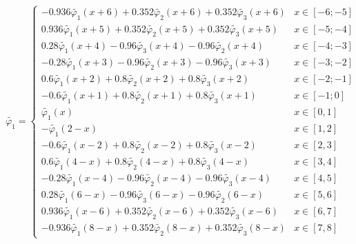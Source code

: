 \documentclass[a4paper, 12pt,fleqn]{extarticle}
\begin{document}
\[
    \tilde{\varphi_1}=
    \begin{cases}
        -0.936 \tilde{\varphi_1}(x+6) + 0.352 \tilde{\varphi_2}(x+6) + 0.352 \tilde{\varphi_3}(x+6)&x\in[-6;-5]\\
        0.936 \tilde{\varphi_1}(x+5) + 0.352 \tilde{\varphi_2}(x+5) + 0.352 \tilde{\varphi_3}(x+5)&x\in[-5;-4]\\
        0.28 \tilde{\varphi_1}(x+4) - 0.96 \tilde{\varphi_3}(x+4) - 0.96 \tilde{\varphi_2}(x+4)&x\in[-4;-3] \\
        -0.28 \tilde{\varphi_1}(x+3) - 0.96 \tilde{\varphi_2}(x+3) - 0.96 \tilde{\varphi_3}(x+3)&x\in[-3;-2] \\
        0.6 \tilde{\varphi_1}(x+2)  + 0.8 \tilde{\varphi_2}(x+2)+ 0.8 \tilde{\varphi_3}(x+2)&x\in[-2;-1]\\
        -0.6 \tilde{\varphi_1}(x+1) + 0.8 \tilde{\varphi_2}(x+1) + 0.8 \tilde{\varphi_3}(x+1)&x\in[-1;0]\\
        \tilde{\varphi_1}(x)&x\in[0,1]\\
        -\tilde{\varphi_1}(2-x)&x\in[1,2]\\
        -0.6 \tilde{\varphi_1}(x-2) + 0.8 \tilde{\varphi_2}(x-2) + 0.8 \tilde{\varphi_3}(x-2)&x\in[2,3]\\
        0.6 \tilde{\varphi_1}(4-x)  + 0.8 \tilde{\varphi_2}(4-x) + 0.8 \tilde{\varphi_3}(4-x)&x\in[3,4]\\
        -0.28 \tilde{\varphi_1}(x-4) - 0.96 \tilde{\varphi_2}(x-4) - 0.96 \tilde{\varphi_3}(x-4)&x\in[4,5] \\
        0.28 \tilde{\varphi_1}(6-x) - 0.96 \tilde{\varphi_3}(6-x) - 0.96 \tilde{\varphi_2}(6-x)&x\in[5,6] \\
        0.936 \tilde{\varphi_1}(x-6) + 0.352 \tilde{\varphi_2}(x-6) + 0.352 \tilde{\varphi_3}(x-6)&x\in[6,7]\\
        -0.936 \tilde{\varphi_1}(8-x) + 0.352 \tilde{\varphi_2}(8-x) + 0.352 \tilde{\varphi_3}(8-x)&x\in[7,8]
    \end{cases}\]
\end{document}

